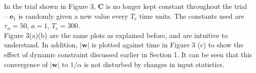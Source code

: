 \documentclass[12pt]{article}
\begin{document}
\begin{figure}[ht]
  \vspace{0.6cm}
  
  \caption{}
  
\end{figure}

In the trial shown in Figure 3, $\boldsymbol{C}$ is no longer kept constant throughout the trial -- $\boldsymbol{e}_1$ is randomly given a new value every $T_e$ time units. The constants used are $\tau_w = 50$, $a=1$, $T_e=300$. \\

Figure 3(a)(b) are the same plots as explained before, and are intuitive to understand. In addition, $|\boldsymbol{w}|$ is plotted against time in Figure 3 (c) to show the effect of dynamic constraint discussed earlier in Section 1. It can be seen that this convergence of $|\boldsymbol{w}|$ to $1/\alpha$ is not disturbed by changes in input statistics.
\end{document}
